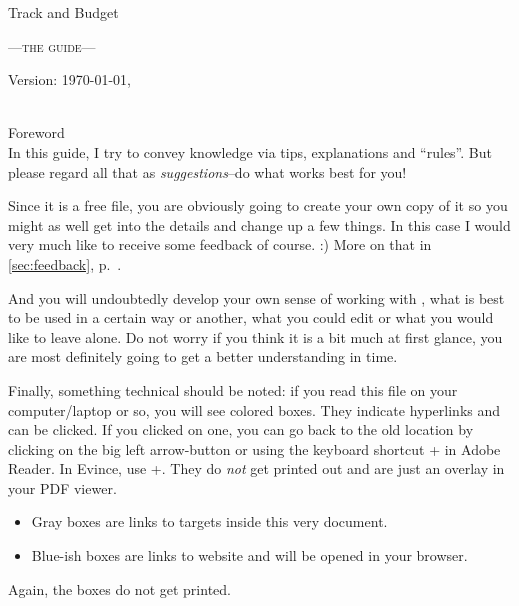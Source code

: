 
\begin{center}\LARGE
Track and Budget
\end{center}
\begin{center}\scshape\large\sffamily
	---the guide---
\end{center}

\vfill
\begin{center}
Version: \today, \thistime
\end{center}

\clearpage
~\\
\vfill
{\sffamily\centering Foreword\label{foreword}\\}
\small\singlespacing\rmfamily
In this guide, I try to convey knowledge via tips, explanations and ``rules''.
But please regard all that as \emph{suggestions}--do what works best for you!

Since it is a free file, you are obviously going to create your own copy of it so you might as well get into the details and change up a few things. In this case I would very much like to receive some feedback of course. :)
More on that in \autoref{sec:feedback}, p.~\pageref{sec:feedback}.

And you will undoubtedly develop your own sense of working with \tfn, what is best to be used in a certain way or another, what you could edit or what you would like to leave alone.
Do not worry if you think it is a bit much at first glance, you are most definitely going to get a better understanding in time.

Finally, something technical should be noted: if you read this file on your computer/laptop or so, you will see colored boxes.
They indicate hyperlinks and can be clicked.
If you clicked on one, you can go back to the old location by clicking on the big left arrow-button or using the keyboard shortcut +\keystroke{\( \leftarrow \)}  in Adobe Reader.
In Evince, use +.
They do \emph{not} get printed out and are just an overlay in your PDF viewer.
\begin{itemize}
	\item Gray boxes are links to targets inside this very document.
	\item Blue-ish boxes are links to website and will be opened in your browser.
\end{itemize}
Again, the boxes do not get printed.